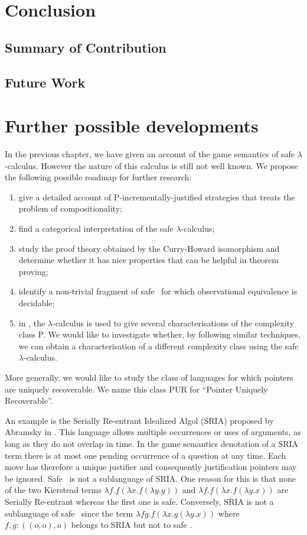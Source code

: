 \chapter{Conclusion}
    \section{Summary of Contribution}
    \section{Future Work}



\chapter{Further possible developments}

In the previous chapter, we have given an account of the game
semantics of safe $\lambda$-calculus. However the nature of this
calculus is still not well known. We propose the following possible
roadmap for further research:
\begin{enumerate}
\item give a detailed account of
P-incrementally-justified strategies that treats the problem of compositionality;
\item find a categorical interpretation of the safe $\lambda$-calculus;
\item study the proof theory obtained by the Curry-Howard isomorphism and determine whether it has nice properties that can be helpful in theorem proving;
\item identify a non-trivial fragment of safe \ialgol\ for which observational equivalence is decidable;
\item in \cite{DBLP:conf/tlca/LeivantM93}, the $\lambda$-calculus is used to
give several characterisations of the complexity class P. We would
like to investigate whether, by following similar techniques, we can
obtain a characterisation of a different complexity class using the
safe $\lambda$-calculus.
\end{enumerate}


More generally, we would like to study the class of languages for
which pointers are uniquely recoverable. We name this class PUR for
``Pointer Uniquely Recoverable''.

An example is the Serially Re-entrant Idealized Algol (SRIA) proposed
by Abramsky  in \cite{abramsky:mchecking_ia}. This language allows
multiple occurrences or uses of arguments, as long as they do not
overlap in time. In the game semantics denotation of a SRIA term
there is at most one pending occurrence of a question at any time.
Each move has therefore a unique justifier and consequently
justification pointers may be ignored. Safe \ialgol\ is not a
sublanguage of SRIA. One reason for this is that none of the two
Kierstead terms $\lambda f . f (\lambda x . f (\lambda y .y ))$ and
$\lambda f . f (\lambda x . f (\lambda y .x ))$ are Serially
Re-entrant whereas the first one is safe. Conversely, SRIA is not a
sublanguage of safe \ialgol\ since the term $\lambda f g. f (\lambda
x . g (\lambda y .x ))$ where $f,g:((o,o),o)$ belongs to SRIA but
not to safe \ialgol.


